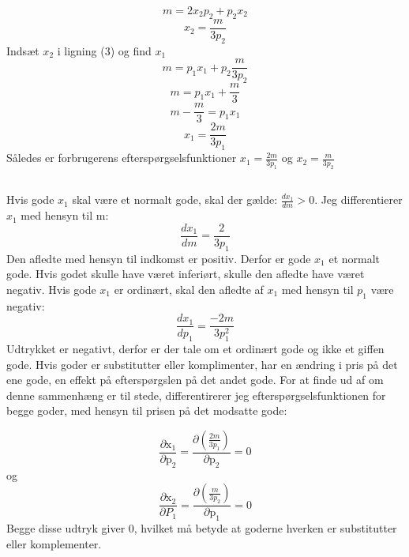 \documentclass{article}
\begin{document}
\begin{equation}
    m=2x_2p_2+p_2x_2
\end{equation}
\begin{equation}
    x_2=\frac{m}{3p_2}
\end{equation}
Indsæt $x_2$ i ligning (3) og find $x_1$
\begin{equation}
    m=p_1x_1+p_2\frac{m}{3p_2}
\end{equation}
\begin{equation}
    m=p_1x_1+\frac{m}{3}
\end{equation}
\begin{equation}
    m-\frac{m}{3}=p_1x_1
\end{equation}
\begin{equation}
    x_1=\frac{2m}{3p_1}
\end{equation}
Således er forbrugerens efterspørgselsfunktioner $x_1=\frac{2m}{3p_1}$ og $x_2=\frac{m}{3p_2}$

\subsection{}
Hvis gode $x_1$ skal være et normalt gode, skal der gælde: $\frac{dx_1}{dm}>0$. Jeg differentierer $x_1$ med hensyn til m:
\begin{equation}
    \frac{dx_1}{dm}=\frac{2}{3p_1}
\end{equation}
Den afledte med hensyn til indkomst er positiv. Derfor er gode $x_1$ et normalt gode. Hvis godet skulle have været inferiørt, skulle den afledte have været negativ. Hvis gode $x_1$ er ordinært, skal den afledte af $x_1$ med hensyn til $p_1$ være negativ:
\begin{equation}
    \frac{dx_1}{dp_1}= \frac{-2m}{3p_1^2}
\end{equation}
Udtrykket er negativt, derfor er der tale om et ordinært gode og ikke et giffen gode. Hvis goder er substitutter eller komplimenter, har en ændring i pris på det ene gode, en effekt på efterspørgslen på det andet gode. For at finde ud af om denne sammenhæng er til stede, differentirerer jeg efterspørgselsfunktionen for begge goder, med hensyn til prisen på det modsatte gode:

$$
\frac{\partial \mathrm{x}_1}{\partial \mathrm{p}_2}=\frac{\partial\left(\frac{2m}{3 p_1}\right)}{\partial \mathrm{p}_2}=0
$$
og
$$
\frac{\partial \mathrm{x}_2}{\partial P_1}=\frac{\partial\left(\frac{m}{3 p_2}\right)}{\partial \mathrm{p}_1}=0
$$
Begge disse udtryk giver 0, hvilket må betyde at goderne hverken er substitutter eller komplementer. 
\end{document}
